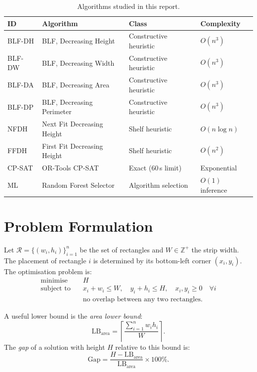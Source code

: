 \documentclass[11pt,a4paper]{article}
\begin{document}
\begin{table}[h]
\centering
\caption{Algorithms studied in this report.}
\label{tab:algorithms}
\begin{tabular}{llll}
\toprule
\textbf{ID} & \textbf{Algorithm} & \textbf{Class} & \textbf{Complexity} \\
\midrule
BLF-DH & BLF, Decreasing Height & Constructive heuristic & $O(n^3)$ \\
BLF-DW & BLF, Decreasing Width  & Constructive heuristic & $O(n^3)$ \\
BLF-DA & BLF, Decreasing Area   & Constructive heuristic & $O(n^3)$ \\
BLF-DP & BLF, Decreasing Perimeter & Constructive heuristic & $O(n^3)$ \\
NFDH   & Next Fit Decreasing Height & Shelf heuristic      & $O(n\log n)$ \\
FFDH   & First Fit Decreasing Height & Shelf heuristic     & $O(n^2)$ \\
CP-SAT & OR-Tools CP-SAT        & Exact (60\,s limit)   & Exponential \\
ML     & Random Forest Selector & Algorithm selection   & $O(1)$ inference \\
\bottomrule
\end{tabular}
\end{table}

\section{Problem Formulation}

Let \(\mathcal{R} = \{(w_i, h_i)\}_{i=1}^n\) be the set of rectangles and
\(W \in \mathbb{Z}^+\) the strip width.
The placement of rectangle \(i\) is determined by its bottom-left corner
\((x_i, y_i)\).
The optimisation problem is:
\begin{align}
\text{minimise} \quad & H \label{eq:obj}\\
\text{subject to} \quad
  & x_i + w_i \le W, \quad y_i + h_i \le H, \quad x_i,y_i \ge 0
    \quad \forall i \label{eq:bounds}\\
  & \text{no overlap between any two rectangles.} \label{eq:nooverlap}
\end{align}

A useful lower bound is the \emph{area lower bound}:
\begin{equation}
\mathrm{LB}_{\text{area}} = \left\lceil \frac{\sum_{i=1}^n w_i h_i}{W} \right\rceil.
\label{eq:lb}
\end{equation}
The \emph{gap} of a solution with height \(H\) relative to this bound is:
\begin{equation}
\mathrm{Gap} = \frac{H - \mathrm{LB}_{\text{area}}}{\mathrm{LB}_{\text{area}}} \times 100\%.
\label{eq:gap}
\end{equation}
\end{document}
